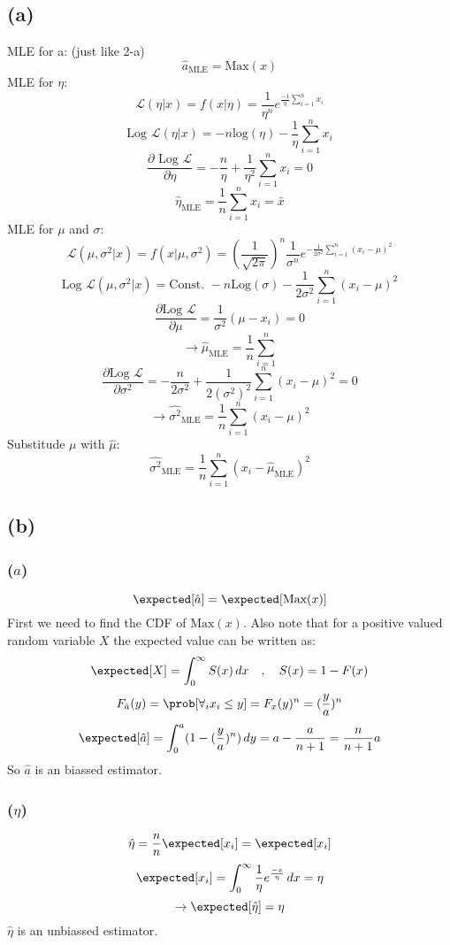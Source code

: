 \subsection{(a)}
MLE for a: (just like 2-a)
$$
\hat{a}_{\text{MLE}} = \text{Max}(x)
$$
MLE for $\eta$:
$$
\mathcal{L}(\eta|x) = f(x|\eta) = \frac{1}{\eta^n}e^{\frac{-1}{\eta}\sum_{i = 1}^nx_i}
$$
$$
\text{Log }\mathcal{L}(\eta|x) = -n\text{log}(\eta) - \frac{1}{\eta}\sum_{i = 1}^nx_i
$$
$$
\frac{\partial \text{ Log }\mathcal{L}}{\partial \eta} = -\frac{n}{\eta} + \frac{1}{\eta^2}\sum_{i = 1}^nx_i = 0
$$
$$
\hat{\eta}_{\text{MLE}} = \frac{1}{n}\sum_{i = 1}^nx_i = \bar{x}
$$
MLE for $\mu$ and $\sigma$:
$$
\mathcal{L}(\mu, \sigma^2|x) = f(x|\mu, \sigma^2) = (\frac{1}{\sqrt{2\pi}})^n\frac{1}{\sigma^n}e^{-\frac{1}{2\sigma^2}\sum_{i = 1}^n(x_i - \mu)^2}
$$
$$
\text{Log }\mathcal{L}(\mu, \sigma^2|x) = \text{Const. } - n\text{Log}(\sigma) - \frac{1}{2\sigma^2}\sum_{i = 1}^n(x_i - \mu)^2
$$
$$
\frac{\partial \text{Log }\mathcal{L}}{\partial\mu} = \frac{1}{\sigma^2}(\mu - x_i) = 0
$$
$$
\rightarrow \hat{\mu}_{\text{MLE}} = \frac{1}{n}\sum_{i = 1}^n
$$
$$
\frac{\partial \text{Log }\mathcal{L}}{\partial\sigma^2} = -\frac{n}{2\sigma^2} + \frac{1}{2(\sigma^2)^2}\sum_{i = 1}^n(x_i - \mu)^2 = 0
$$
$$
\rightarrow\hat{\sigma^2}_{\text{MLE}} = \frac{1}{n}\sum_{i = 1}^n(x_i - \mu)^2
$$
Substitude $\mu$ with $\hat{\mu}$:
$$
\hat{\sigma^2}_{\text{MLE}} = \frac{1}{n}\sum_{i = 1}^n(x_i - \hat{\mu}_{\text{MLE}})^2
$$
\subsection{(b)}
\subsubsection{($a$)}
$$
\expected[\hat{a}] = \expected[\text{Max}(x)] 
$$
First we need to find the CDF of $\text{Max}(x)$. Also note that for a positive valued random variable $X$ the expected value can be 
written as:
$$
\expected[X] = \int_0^\infty S(x)\,dx\quad,\quad S(x) = 1 - F(x)
$$
$$
F_{\hat{a}}(y) = \prob[\forall_ix_i\leq y] = F_x(y)^n = (\frac{y}{a})^n
$$
$$
\expected[\hat{a}] = \int_0^a(1 - (\frac{y}{a})^n)\,dy = a - \frac{a}{n + 1} = \frac{n}{n + 1}a
$$
So $\hat{a}$ is an biassed estimator.
\subsubsection{($\eta$)}
$$
\hat{\eta} = \frac{n}{n}\expected[x_i] = \expected[x_i]
$$
$$
\expected[x_i] = \int_0^\infty\frac{1}{\eta}e^{\frac{-x}{\eta}}\,dx = \eta
$$
$$
\rightarrow \expected[\hat{\eta}] = \eta
$$
$\hat{\eta}$ is an unbiassed estimator.

